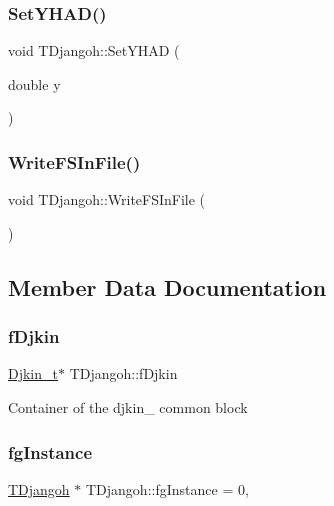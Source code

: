 \subsubsection{\texorpdfstring{Set\+Y\+H\+A\+D()}{SetYHAD()}}
{\footnotesize\ttfamily void T\+Djangoh\+::\+Set\+Y\+H\+AD (\begin{DoxyParamCaption}\item[{double}]{y }\end{DoxyParamCaption})\hspace{0.3cm}{\ttfamily [inline]}}

\mbox{\label{class_t_djangoh_aa78f3a43ed71499a9efe9e87cc22d668}} 
\subsubsection{\texorpdfstring{Write\+F\+S\+In\+File()}{WriteFSInFile()}}
{\footnotesize\ttfamily void T\+Djangoh\+::\+Write\+F\+S\+In\+File (\begin{DoxyParamCaption}{ }\end{DoxyParamCaption})}



\subsection{Member Data Documentation}
\mbox{\label{class_t_djangoh_a870f9e5b91afdae5f21c10daae7c5d7e}} 
\subsubsection{\texorpdfstring{f\+Djkin}{fDjkin}}
{\footnotesize\ttfamily \hyperlink{struct_djkin__t}{Djkin\+\_\+t}$\ast$ T\+Djangoh\+::f\+Djkin\hspace{0.3cm}{\ttfamily [protected]}}

Container of the djkin\+\_\+ common block \mbox{\label{class_t_djangoh_ad154e9fce28f84ab490dc6508db58fb8}} 
\subsubsection{\texorpdfstring{fg\+Instance}{fgInstance}}
{\footnotesize\ttfamily \hyperlink{class_t_djangoh}{T\+Djangoh} $\ast$ T\+Djangoh\+::fg\+Instance = 0\hspace{0.3cm}{\ttfamily [static]}, {\ttfamily [protected]}}

